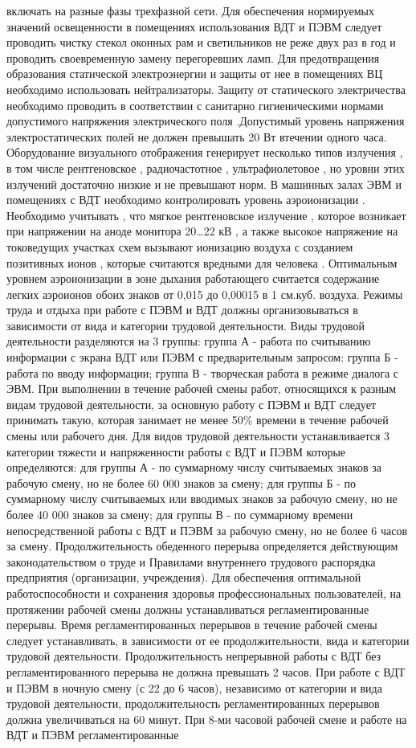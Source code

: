 включать на разные фазы трехфазной сети. Для обеспечения нормируемых значений освещенности в помещениях использования ВДТ и ПЭВМ следует проводить чистку стекол оконных рам и светильников не реже двух раз в год и проводить своевременную замену перегоревших ламп. Для предотвращения образования статической электроэнергии и защиты от нее в помещениях ВЦ необходимо использовать нейтрализаторы. Защиту от статического электричества необходимо проводить в соответствии с санитарно
гигиеническими нормами допустимого напряжения электрического поля .Допустимый уровень напряжения электростатических полей не должен превышать 20 Вт втечении одного часа. Оборудование визуального отображения генерирует несколько типов излучения , в том числе рентгеновское , радиочастотное , ультрафиолетовое , но уровни этих излучений достаточно низкие и не превышают норм. В машинных залах ЭВМ и помещениях с ВДТ необходимо контролировать уровень аэроионизации . Необходимо учитывать , что мягкое рентгеновское излучение , которое возникает при напряжении на аноде монитора 20…22 кВ , а также высокое напряжение на токоведущих участках схем вызывают ионизацию воздуха с созданием позитивных ионов , которые считаются вредными для человека . Оптимальным уровнем аэроионизации в зоне дыхания работающего считается содержание легких аэроионов обоих знаков от 0,015 до 0,00015 в 1 см.куб. воздуха. Режимы труда и отдыха при работе с ПЭВМ и ВДТ должны организовываться в зависимости от вида и категории трудовой деятельности. Виды трудовой деятельности разделяются на 3 группы: группа А - работа по считыванию информации с экрана ВДТ или ПЭВМ с предварительным запросом: группа Б - работа по вводу информации; группа В - творческая работа в режиме диалога с ЭВМ. При выполнении в течение рабочей смены работ, относящихся к разным видам трудовой деятельности, за основную работу с ПЭВМ и ВДТ следует принимать такую, которая занимает не менее 50\% времени в течение рабочей смены или рабочего дня. Для видов трудовой деятельности устанавливается 3 категории тяжести и напряженности работы с ВДТ и ПЭВМ которые определяются: для группы А - по суммарному числу считываемых знаков за рабочую смену, но не более 60 000 знаков за смену; для группы Б - по суммарному числу считываемых или вводимых знаков за рабочую смену, но не более 40 000 знаков за смену; для группы В - по суммарному времени непосредственной работы с ВДТ и ПЭВМ за рабочую смену, но не более 6 часов за смену. Продолжительность обеденного перерыва определяется действующим законодательством о труде и Правилами внутреннего трудового распорядка предприятия (организации, учреждения). Для обеспечения оптимальной работоспособности и сохранения здоровья профессиональных пользователей, на протяжении рабочей смены должны устанавливаться регламентированные перерывы. Время регламентированных перерывов в течение рабочей смены следует устанавливать, в зависимости от ее продолжительности, вида и категории трудовой деятельности. Продолжительность непрерывной работы с ВДТ без регламентированного перерыва не должна превышать 2 часов. При работе с ВДТ и ПЭВМ в ночную смену (с 22 до 6 часов), независимо от категории и вида трудовой деятельности, продолжительность регламентированных перерывов должна увеличиваться на 60 минут. При 8-ми часовой рабочей смене и работе на ВДТ и ПЭВМ регламентированные 